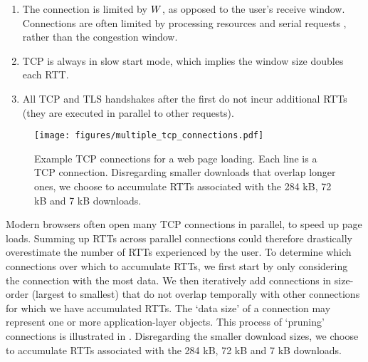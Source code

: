 \documentclass[sigconf,letterpaper,nonacm,10pt,anonymous]{acmart}
\begin{document}
\begin{enumerate}


\item The connection is limited by $\mathnormal{W}$, as opposed to the user's receive window. Connections are often limited by processing resources and serial requests , rather than the congestion window.
\item TCP is always in slow start mode, which implies the window size doubles each RTT.
\item All TCP and TLS handshakes after the first do not incur additional RTTs (\ie they are executed in parallel to other requests).


\end{enumerate}

\begin{figure}
    \centering
    \texttt{[image: figures/multiple\_tcp\_connections.pdf]}
    \caption{Example TCP connections for a web page loading. Each line is a TCP connection. Disregarding smaller downloads that overlap longer ones, we choose to accumulate RTTs associated with the 284 kB, 72 kB and 7 kB downloads.}
    \label{fig:multiple_tcp_connections}
\end{figure}

\iffalse

\textbackslash{}begin\{algorithm\}
\caption{Algorithm for pruning connections over which to accumulate RTTs. Larger connections are considered first, and RTTs for smaller connections are only accumulated if they do not overlap in time with any connection already being considered.}
\label{alg:rtt_pruning_algorithm}
\textbackslash{}begin\{algorithmic\}\footnote{We take care to ensure
  that user counts are not ``double counted'' across different resolver
  IP addresses in the same /24.} \State \(pruned\_connections\)
\(\gets\) \([max\_size(connections)]\) \State \(found\_new \gets False\)
\While{$found\_new$} \For{c $\in$ connections}
\If{not $overlap\_in\_time(pruned\_connections, c)$}
\State \(pruned\_connections\) \(\gets\) \(pruned\_connections\)
\(\cup\) c \State \(found\_new\) \(\gets\) True \State break \EndIf
\EndFor
\EndWhile
\textbackslash{}end\{algorithmic\} \textbackslash{}end\{algorithm\}

\fi

Modern browsers often open many TCP connections in parallel, to speed up
page loads. Summing up RTTs across parallel connections could therefore
drastically overestimate the number of RTTs experienced by the user.
\iffalse The algorithm we use to determine the connections over which we
accumulate RTTs is summarized in \Cref{alg:rtt_pruning_algorithm}.
\fi To determine which connections over which to accumulate RTTs, we
first start by only considering the connection with the most data. We
then iteratively add connections in size-order (largest to smallest)
that do not overlap temporally with other connections for which we have
accumulated RTTs. The `data size' of a connection may represent one or
more application-layer objects. This process of `pruning' connections is
illustrated in . Disregarding the
smaller download sizes, we choose to accumulate RTTs associated with the
284 kB, 72 kB and 7 kB downloads.
\end{document}
